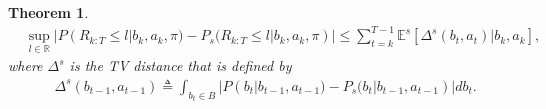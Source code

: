 \documentclass[10pt,a4paper]{amsart}
\newtheorem{theorem}{Theorem}
\begin{document}
\begin{theorem}\label{prf:simplification_bound_over_belief_distribution}
	\begin{equation}
		\begin{aligned}
			&\sup_{l\in \mathbb{R}}|P(R_{k:T} \leq l|b_k, a_k,\pi) \! -\! P_s(R_{k:T} \leq l|b_k, a_k,\pi)| \!
			\leq \!\! \! \sum_{t=k}^{T-1} \mathbb{E}^s[\Delta^s(b_t, a_t)|b_k, a_k],
		\end{aligned}
	\end{equation}
	where $\Delta^s$ is the TV distance that is defined by
	\begin{equation}
		\begin{aligned}
			&\Delta^s(b_{t-1},a_{t-1}) \triangleq 
			\int_{b_t\in B} |P(b_t|b_{t-1},a_{t-1})-P_s(b_t|b_{t-1},a_{t-1})|db_t.
		\end{aligned}
	\end{equation}
	
\end{theorem}
\end{document}
